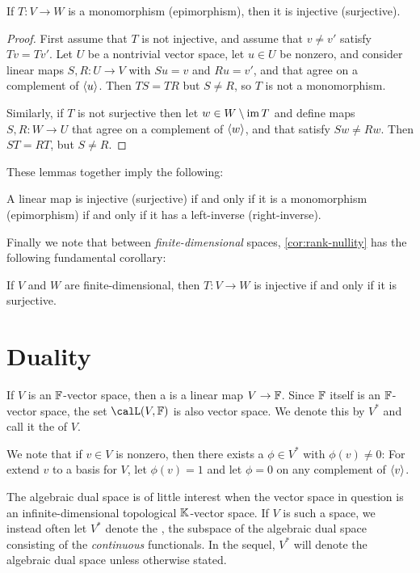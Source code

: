 \begin{lemma}
    If $T \colon V \to W$ is a monomorphism (epimorphism), then it is injective (surjective).
\end{lemma}

\begin{proof}
    First assume that $T$ is not injective, and assume that $v \neq v'$ satisfy $Tv = Tv'$. Let $U$ be a nontrivial vector space, let $u \in U$ be nonzero, and consider linear maps $S,R \colon U \to V$ with $Su = v$ and $Ru = v'$, and that agree on a complement of $\langle u\rangle$. Then $TS = TR$ but $S \neq R$, so $T$ is not a monomorphism.

    Similarly, if $T$ is not surjective then let $w \in W \setminus \operatorname{im} T$ and define maps $S,R \colon W \to U$ that agree on a complement of $\langle w\rangle$, and that satisfy $Sw \neq Rw$. Then $ST = RT$, but $S \neq R$.
\end{proof}
%
These lemmas together imply the following:

\begin{theoremnoproof}
    A linear map is injective (surjective) if and only if it is a monomorphism (epimorphism) if and only if it has a left-inverse (right-inverse).
\end{theoremnoproof}


Finally we note that between \emph{finite-dimensional} spaces, \cref{cor:rank-nullity} has the following fundamental corollary:

\begin{corollarynoproof}
    If $V$ and $W$ are finite-dimensional, then $T \colon V \to W$ is injective if and only if it is surjective.
\end{corollarynoproof}


\section{Duality}

If $V$ is an $\mathbb{F}$-vector space, then a  is a linear map $V \to \mathbb{F}$. Since $\mathbb{F}$ itself is an $\mathbb{F}$-vector space, the set $\lin(V,\fieldF)$ is also vector space. We denote this by $V^*$ and call it the  of $V$.

We note that if $v \in V$ is nonzero, then there exists a $\phi \in V^*$ with $\phi(v) \neq 0$: For extend $v$ to a basis for $V$, let $\phi(v) = 1$ and let $\phi = 0$ on any complement of $\langle v\rangle$.

The algebraic dual space is of little interest when the vector space in question is an infinite-dimensional topological $\mathbb{K}$-vector space. If $V$ is such a space, we instead often let $V^*$ denote the , the subspace of the algebraic dual space consisting of the \emph{continuous} functionals. In the sequel, $V^*$ will denote the algebraic dual space unless otherwise stated.

